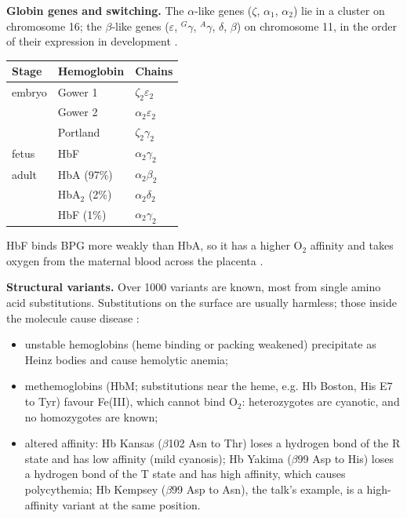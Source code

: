 \textbf{Globin genes and switching.}
The $\alpha$-like genes ($\zeta$, $\alpha_1$,
$\alpha_2$) lie in a cluster on chromosome
16; the $\beta$-like genes ($\varepsilon$,
$^G\gamma$, $^A\gamma$, $\delta$, $\beta$) on
chromosome 11, in the order of their
expression in development \cite[Chapter
28]{voet2013fundamentals}.

\begin{center}
\begin{tabular}{lll}
Stage & Hemoglobin & Chains \\
\hline
embryo & Gower 1 & $\zeta_2\varepsilon_2$ \\
 & Gower 2 & $\alpha_2\varepsilon_2$ \\
 & Portland & $\zeta_2\gamma_2$ \\
fetus & HbF & $\alpha_2\gamma_2$ \\
adult & HbA (97\%) & $\alpha_2\beta_2$ \\
 & HbA$_2$ (2\%) & $\alpha_2\delta_2$ \\
 & HbF (1\%) & $\alpha_2\gamma_2$ \\
\end{tabular}
\end{center}

HbF binds BPG more weakly than HbA, so it has
a higher $\mathrm{O_2}$ affinity and takes
oxygen from the maternal blood across the
placenta \cite[Section
7-1]{voet2013fundamentals}.

\textbf{Structural variants.}
Over 1000 variants are known, most from
single amino acid substitutions.
Substitutions on the surface are usually
harmless; those inside the molecule cause
disease \cite[Section
7-1]{voet2013fundamentals}:
\begin{itemize}
\item unstable hemoglobins (heme binding or
packing weakened) precipitate as Heinz bodies
and cause hemolytic anemia;
\item methemoglobins (HbM; substitutions near
the heme, e.g. Hb Boston, His E7 to Tyr)
favour Fe(III), which cannot bind
$\mathrm{O_2}$: heterozygotes are cyanotic,
and no homozygotes are known;
\item altered affinity: Hb Kansas ($\beta$102
Asn to Thr) loses a hydrogen bond of the R
state and has low affinity (mild cyanosis);
Hb Yakima ($\beta$99 Asp to His) loses a
hydrogen bond of the T state and has high
affinity, which causes polycythemia; Hb
Kempsey ($\beta$99 Asp to Asn), the talk's
example, is a high-affinity variant at the
same position.
\end{itemize}


